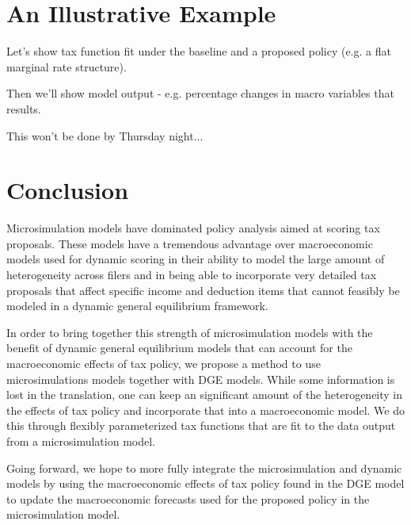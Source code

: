 \documentclass[letterpaper,12pt]{article}
\theoremstyle{definition}
\begin{document}
\begin{spacing}{1.5}
\section{An Illustrative Example}\label{SecResults}

Let's show tax function fit under the baseline and a proposed policy (e.g. a flat marginal rate structure).

Then we'll show model output - e.g. percentage changes in macro variables that results.

This won't be done by Thursday night...

\section{Conclusion}\label{SecConclusion}

  Microsimulation models have dominated policy analysis aimed at scoring tax proposals.  These models have a tremendous advantage over macroeconomic models used for dynamic scoring in their ability to model the large amount of heterogeneity across filers and in being able to incorporate very detailed tax proposals that affect specific income and deduction items that cannot feasibly be modeled in a dynamic general equilibrium framework.

 In order to bring together this strength of microsimulation models with the benefit of dynamic general equilibrium models that can account for the macroeconomic effects of tax policy, we propose a method to use microsimulations models together with DGE models.  While some information is lost in the translation, one can keep an significant amount of the heterogeneity in the effects of tax policy and incorporate that into a macroeconomic model.  We do this through flexibly parameterized tax functions that are fit to the data output from a microsimulation model.

 Going forward, we hope to more fully integrate the microsimulation and dynamic models by using the macroeconomic effects of tax policy found in the DGE model to update the macroeconomic forecasts used for the proposed policy in the microsimulation model.


\clearpage

\end{spacing}


\newpage



\newpage
\renewcommand{\theequation}{A.\arabic{section}.\arabic{equation}}
\renewcommand{\thesection}{A-\arabic{section}}   %
\setcounter{equation}{0}                         %
\setcounter{section}{0}                          %
\end{document}
